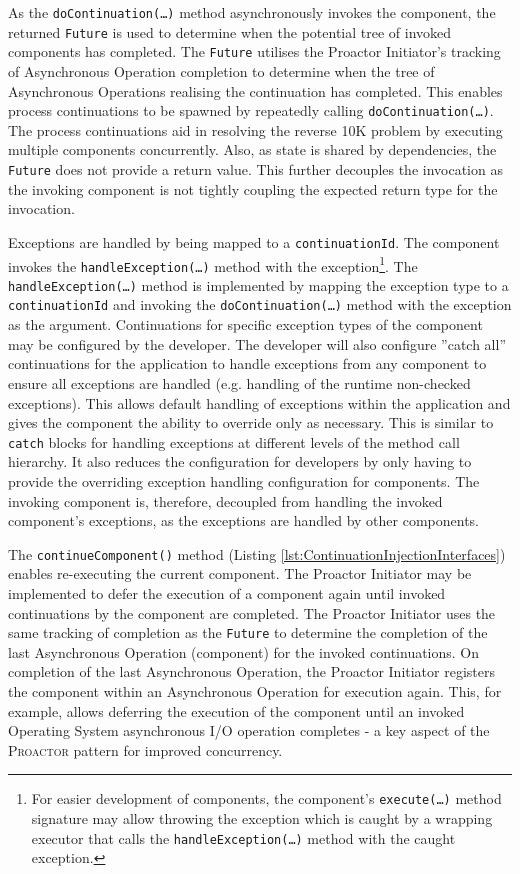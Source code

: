 \documentclass[prodmode]{style/acmlarge}
\begin{document}
As the \texttt{doContinuation(\ldots)} method asynchronously invokes the
component, the returned \texttt{Future} is used to determine when the potential
tree of invoked components has completed.  The \texttt{Future} utilises the
Proactor Initiator's tracking of Asynchronous Operation completion to determine
when the tree of Asynchronous Operations realising the continuation has
completed.  This enables process continuations \cite{process-continuation} to be
spawned by repeatedly calling \texttt{doContinuation(\ldots)}.  The process
continuations aid in resolving the reverse 10K problem
\cite{reverse-ten-k-problem} by executing multiple components concurrently.
Also, as state is shared by dependencies, the \texttt{Future} does not provide a
return value.  This further decouples the invocation as the invoking component
is not tightly coupling the expected return type for the invocation.

Exceptions are handled by being mapped to a \texttt{continuationId}.  The
component invokes the \texttt{handle\-Excep\-tion(\ldots)} method with the
exception\footnote{For easier development of components, the component's
\texttt{execute(\ldots)} method signature may allow throwing the exception which
is caught by a wrapping executor that calls the \texttt{handleException(\ldots)}
method with the caught exception.}.  The \texttt{handleException(\ldots)} method
is implemented by mapping the exception type to a \texttt{continuationId} and
invoking the \texttt{doContinuation(\ldots)} method with the exception as the
argument.  Continuations for specific exception types of the component may be
configured by the developer.  The developer will also configure ''catch all''
continuations for the application to handle exceptions from any component to
ensure all exceptions are handled (e.g. handling of the runtime non-checked
exceptions).  This allows default handling of exceptions within the application
and gives the component the ability to override only as necessary.  This is
similar to \texttt{catch} blocks for handling exceptions at different levels of
the method call hierarchy.  It also reduces the configuration for developers by
only having to provide the overriding exception handling configuration for
components.  The invoking component is, therefore, decoupled from handling the
invoked component's exceptions, as the exceptions are handled by other
components.

The \texttt{continueComponent()} method (Listing
\ref{lst:ContinuationInjectionInterfaces}) enables re-executing the current
component.  The Proactor Initiator may be implemented to defer the execution of
a component again until invoked continuations by the component are completed. 
The Proactor Initiator uses the same tracking of completion as the
\texttt{Future} to determine the completion of the last Asynchronous Operation
(component) for the invoked continuations.  On completion of the last
Asynchronous Operation, the Proactor Initiator registers the component within an
Asynchronous Operation for execution again.  This, for example, allows deferring
the execution of the component until an invoked Operating System asynchronous
I/O operation completes - a key aspect of the \textsc{Proactor} pattern for
improved concurrency.
\end{document}
